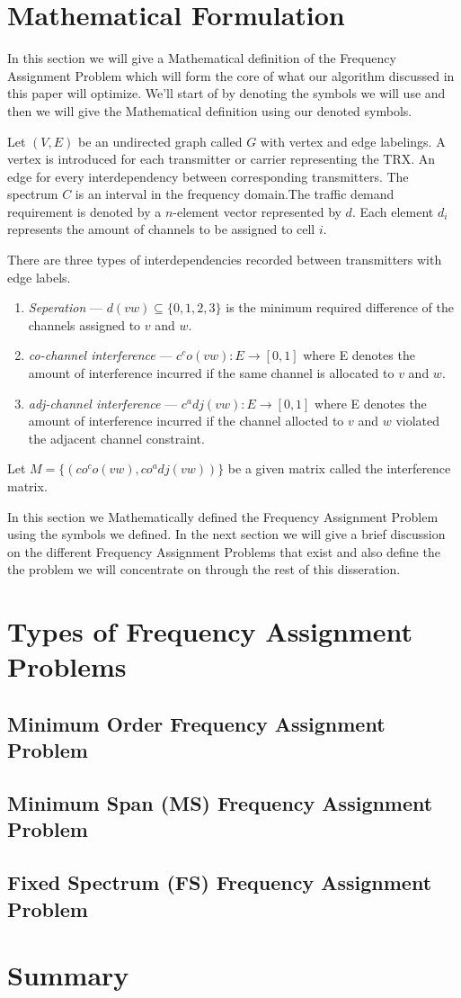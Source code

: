 \section{Mathematical Formulation}
In this section we will give a Mathematical definition of the Frequency Assignment Problem which will form the core of what our algorithm discussed in this paper will optimize. We'll start of by denoting the symbols we will use and then we will give the Mathematical definition using our denoted symbols.

Let \((V,E)\) be an undirected graph called \(G\) with vertex and edge labelings. A vertex is introduced for each transmitter or carrier representing the TRX. An edge for every interdependency between corresponding transmitters. The spectrum \(C\) is an interval in the frequency domain.The traffic demand requirement is denoted by a \(n\)-element vector represented by \(d\). Each element \(d_i\) represents the amount of channels to be assigned to cell \(i\).

There are three types of interdependencies recorded between transmitters with edge labels.
\begin{enumerate}
\item \emph{Seperation} --- \(d(vw) \subseteq \{0,1,2,3\}\) is the minimum required difference of the channels assigned to \(v\) and \(w\).
\item \emph{co-channel interference} --- \(c^co (vw) : E \rightarrow [0,1]\) where E denotes the amount of interference incurred if the same channel is allocated to \(v\) and \(w\).
\item \emph{adj-channel interference} --- \(c^adj (vw) : E \rightarrow [0,1]\) where E denotes the amount of interference incurred if the channel allocted to \(v\) and \(w\) violated the adjacent channel constraint.
\end{enumerate}

Let \(M = \lbrace (co^co (vw),co^adj (vw))\rbrace\) be a given matrix called the interference matrix.

In this section we Mathematically defined the Frequency Assignment Problem using the symbols we defined. In the next section we will give a brief discussion on the different Frequency Assignment Problems that exist and also define the the problem we will concentrate on through the rest of this disseration.
\section{Types of Frequency Assignment Problems}
\subsection{Minimum Order Frequency Assignment Problem}
\subsection{Minimum Span (MS) Frequency Assignment Problem}
\subsection{Fixed Spectrum (FS) Frequency Assignment Problem}
\section{Summary}
